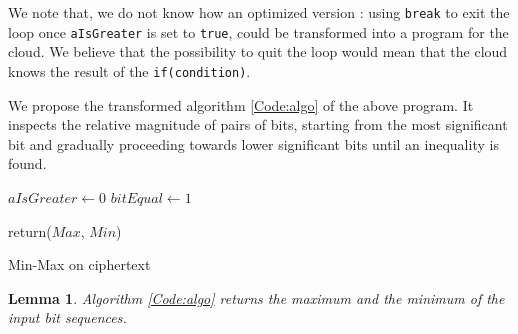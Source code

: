 \documentclass{acm_proc_article-sp}
\begin{document}
We note that, we do not know how an optimized version :  using \texttt{break} to exit the loop once \texttt{aIsGreater} is set to \texttt{true}, could be transformed into a program for the cloud. We believe that the possibility to quit the loop would mean that the cloud knows the result of the \texttt{if(condition)}. 

We propose the transformed algorithm \autoref{Code:algo} of the above program. It inspects the relative magnitude of pairs of bits, starting from the most significant bit and gradually proceeding towards lower significant bits until an inequality is found.
 


\linesnumbered

\begin{algorithm}[H]

\SetVline



 $aIsGreater \leftarrow 0$\;
 $bitEqual \leftarrow 1$\;
	


return($Max$, $Min$)

 \caption{Min-Max on ciphertext \label{Code:algo}}


\end{algorithm}

\newtheorem{theorem}{Lemma}
\begin{theorem}
Algorithm \autoref{Code:algo} returns the maximum and the minimum of the input bit sequences. 
\end{theorem}
\end{document}
